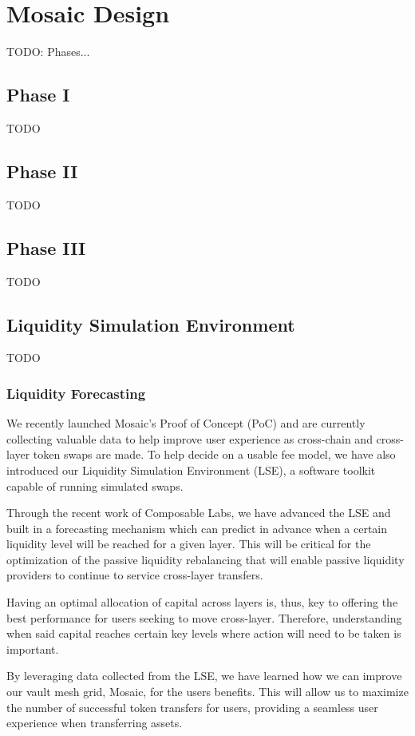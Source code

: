 \section{Mosaic Design}
TODO: Phases...

\subsection{Phase I}
TODO

\subsection{Phase II}
TODO

\subsection{Phase III}
TODO

\subsection{Liquidity Simulation Environment}
TODO

\subsubsection{Liquidity Forecasting}
We recently launched Mosaic’s Proof of Concept (PoC) and are currently collecting valuable data to help improve user experience as cross-chain and cross-layer token swaps are made. To help decide on a usable fee model, we have also introduced our Liquidity Simulation Environment (LSE), a software toolkit capable of running simulated swaps.

Through the recent work of Composable Labs, we have advanced the LSE and built in a forecasting mechanism which can predict in advance when a certain liquidity level will be reached for a given layer. This will be critical for the optimization of the passive liquidity rebalancing that will enable passive liquidity providers to continue to service cross-layer transfers.

Having an optimal allocation of capital across layers is, thus, key to offering the best performance for users seeking to move cross-layer. Therefore, understanding when said capital reaches certain key levels where action will need to be taken is important.

By leveraging data collected from the LSE, we have learned how we can improve our vault mesh grid, Mosaic, for the users benefits. This will allow us to maximize the number of successful token transfers for users, providing a seamless user experience when transferring assets.

